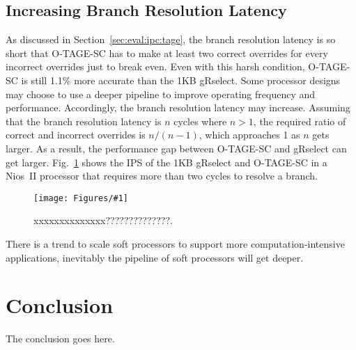 \documentclass[conference]{IEEEtran}
\newcommand{\kfig}[4]{ %
        \begin{figure}[!t]
        \centering
        \texttt{[image: Figures/\#1]}
        \vspace{-1mm}
        \caption{#3}
        \label{#2}
        \end{figure}
}
\begin{document}
\subsection{Increasing Branch Resolution Latency}
\label{sec:eval:brresolvelatency}
As discussed in Section~\ref{sec:eval:ipc:tage}, the branch resolution latency is so short that \mbox{O-TAGE-SC} has to make at least two correct overrides for every incorrect overrides just to break even. Even with this harsh condition, \mbox{O-TAGE-SC} is still 1.1\% more accurate than the 1KB gRselect. Some processor designs may choose to use a deeper pipeline to improve operating frequency and performance. Accordingly, the branch resolution latency may increase. Assuming that the branch resolution latency is $n$ cycles where $n > 1$, the required ratio of correct and incorrect overrides is $n/(n-1)$, which approaches 1 as $n$ gets larger. As a result,  the performance gap between \mbox{O-TAGE-SC} and gRselect can get larger. Fig.~\ref{fig:brresolve} shows the IPS of the 1KB gRselect and \mbox{O-TAGE-SC} in a Nios~II processor that requires more than two cycles to resolve a branch. 
\kfig{brresolve.pdf}{fig:brresolve}{xxxxxxxxxxxxxx??????????????.}{angle = 0, trim = 1in 1in 0.7in 1.5in, clip, width=0.4\textwidth}

There is a trend to scale soft processors to support more computation-intensive applications, inevitably the pipeline of soft processors will get deeper. 



\section{Conclusion}
The conclusion goes here.











\end{document}
